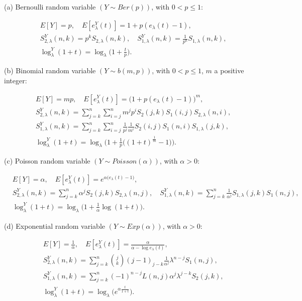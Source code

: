 \documentclass[a4paper,11pt]{amsart}
\begin{document}
\vspace{0.1in}
\noindent (a) Bernoulli random variable $(Y \sim Ber(p))$, with $ 0<p \le 1$: \par
\begin{align*}
&E[Y]= p, \quad   E[e_{\lambda}^{Y}(t)]= 1+p(e_{\lambda}(t)-1),  \\
&S_{2,\lambda}^{Y}(n,k)= p^{k}S_{2,\lambda}(n,k), \quad S_{1,\lambda}^{Y}(n,k)=\frac{1}{p^{n}}S_{1,\lambda}(n,k),\\
&\log_{\lambda}^{Y}(1+t)=\log_{\lambda}\big(1+\frac{t}{p}\big).
\end{align*}

(b) Binomial random variable $(Y \sim b(m,p))$, with $ 0<p \le 1$, $m$ a positive integer: \par
\begin{align*}
&E[Y]= mp, \quad  E[e_{\lambda}^{Y}(t)]=\big(1+p(e_{\lambda}(t)-1)\big)^{m},       \\
&S_{2,\lambda}^{Y}(n,k)=\sum_{j=k}^{n}\sum_{i=j}^{n}m^{j}p^{i}S_{2}(j,k)S_{1}(i,j)S_{2,\lambda}(n,i), \\
&S_{1,\lambda}^{Y}(n,k)= \sum_{j=k}^{n}\sum_{i=j}^{n}\frac{1}{p^{j}}\frac{1}{m^{i}}S_{2}(i,j)S_{1}(n,i)S_{1,\lambda}(j,k), \\
&\log_{\lambda}^{Y}(1+t)=\log_{\lambda}\big(1+\frac{1}{p}\big((1+t)^{\frac{1}{m}}-1\big)\big).
\end{align*}

(c) Poisson random variable $(Y \sim Poisson(\alpha))$, with $ \alpha > 0$: \par
\begin{align*}
&E[Y]= \alpha,  \quad   E[e_{\lambda}^{Y}(t)]=e^{\alpha\big(e_{\lambda}(t)-1\big)},       \\
&S_{2,\lambda}^{Y}(n,k)= \sum_{j=k}^{n}\alpha^{j}S_{2}(j,k)S_{2,\lambda}(n,j), \quad S_{1,\lambda}^{Y}(n,k)= \sum_{j=k}^{n}\frac{1}{\alpha^{j}}S_{1,\lambda}(j,k)S_{1}(n,j), \\
&\log_{\lambda}^{Y}(1+t)=\log_{\lambda}\big(1+\frac{1}{\alpha}\log(1+t)\big).
\end{align*}

(d) Exponential random variable $(Y \sim Exp(\alpha))$, with $\alpha > 0$: \par
\begin{align*}
&E[Y]=\frac{1}{\alpha},  \quad   E[e_{\lambda}^{Y}(t)]= \frac{\alpha}{\alpha-\log e_{\lambda}(t)}, \\
&S_{2,\lambda}^{Y}(n,k)= \sum_{j=k}^{n}\binom{j}{k}(j-1)_{j-k}\frac{1}{\alpha^{j}}\lambda^{n-j}S_{1}(n,j),\\       
&S_{1,\lambda}^{Y}(n,k)= \sum_{j=k}^{n}(-1)^{n-j}L(n,j)\alpha^{j}\lambda^{j-k}S_{2}(j,k), \\
&\log_{\lambda}^{Y}(1+t)=\log_{\lambda}\big(e^{\alpha \frac{t}{1+t}}\big).
\end{align*}
\end{document}
